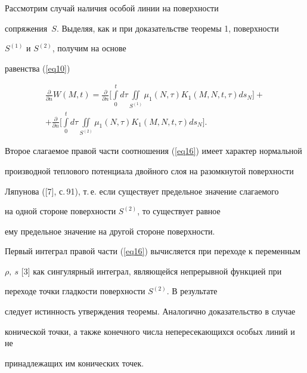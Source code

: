 \begin{pf}


Рассмотрим случай наличия особой линии на поверхности 


сопряжения~$S$. Выделяя, как и при доказательстве теоремы 1, поверхности 


$S^{({1})}$ и $S^{({2})}$, получим на основе 


равенства (\ref{eq10})


\begin{multline}


\label{eq16}


\frac{{\partial}}{{\partial n}}W ({M,t})=\frac{{\partial }}{{\partial n}}


\bigg[{\int\limits_{0}^{t} {} d\tau \iint\limits_{S^{({1})}} 


{} \mu_{1} ({N,\tau})K_{1} ({M,N,t,\tau})ds_{N} }\bigg]+\\


%


+\frac{{\partial}}{{\partial n}} \bigg[{\int\limits_{0}^{t} {} d\tau 


\iint\limits_{S^{({2})}} {} \mu_{1} ({N,\tau} 


)K_{1} ({M,N,t,\tau})ds_{N}}\bigg].


\end{multline}





Второе слагаемое правой части соотношения (\ref{eq16}) имеет характер нормальной 


производной теплового потенциала двойного слоя на разомкнутой поверхности 


Ляпунова ([7], с.\,91), т.\,е. если существует предельное значение слагаемого 


на одной стороне поверхности $S^{({2})}$, то существует равное 


ему предельное значение на другой стороне поверхности. 





Первый интеграл правой части (\ref{eq16}) вычисляется при переходе к переменным 


$\rho,\ s$ [3] как сингулярный интеграл, являющейся непрерывной функцией при 


переходе точки гладкости поверхности $S^{({2})}$. В результате 


следует истинность утверждения теоремы. Аналогично доказательство в случае 


конической точки, а также конечного числа непересекающихся особых линий и не 


принадлежащих им конических точек.


\end{pf}








